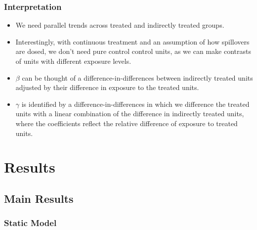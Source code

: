 \documentclass[aspectratio=169, t]{beamer}
\begin{document}
\begin{frame}
\frametitle{Interpretation}

	\vspace{2mm}

	\begin{itemize}
		\vspace{2mm}\item We need parallel trends across treated and indirectly treated groups. 
		\vspace{2mm}\item Interestingly, with continuous treatment and an assumption of how spillovers are dosed, 
		we don't need pure control control units, as we can make contrasts of units with different exposure levels. 
		\vspace{2mm}\item $\beta$ can be thought of a difference-in-differences between indirectly treated units
		adjusted by their difference in exposure to the treated units. 
		\vspace{2mm}\item $\gamma$ is identified by a difference-in-differences in which we difference the treated units with a linear combination 
		of the difference in indirectly treated units, where the coefficients reflect the relative difference of exposure to treated units.
	\end{itemize}
\end{frame}

\section{Results}

\subsection{Main Results}

\begin{frame}
    \frametitle{Static Model}

    
\end{frame}
\end{document}
